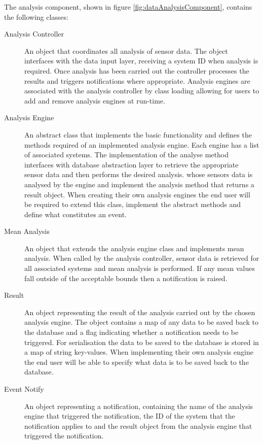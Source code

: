 The analysis component, shown in figure \ref{fig:dataAnalysisComponent}, contains the following classes:
\begin{description}
\item [Analysis Controller] An object that coordinates all analysis of sensor data. The object interfaces with the data input layer, receiving a system ID when analysis is required. Once analysis has been carried out the controller processes the results and triggers notifications where appropriate. Analysis engines are associated with the analysis controller by class loading allowing for users to add and remove analysis engines at run-time.
\item [Analysis Engine] An abstract class that implements the basic functionality and defines the methods required of an implemented analysis engine. Each engine has a list of associated systems. The implementation of the analyse method interfaces with database abstraction layer to retrieve the appropriate sensor data and then performs the desired analysis. whose sensors data is analysed by the engine and implement the analysis method that returns a result object. When creating their own analysis engines the end user will be required to extend this class, implement the abstract methods and define what constitutes an event.
\item [Mean Analysis] An object that extends the analysis engine class and implements mean analysis. When called by the analysis controller, sensor data is retrieved for all associated systems and mean analysis is performed. If any mean values fall outside of the acceptable bounds then a notification is raised.
\item [Result] An object representing the result of the analysis carried out by the chosen analysis engine. The object contains a map of any data to be saved back to the database and a flag indicating whether a notification needs to be triggered. For serialisation the data to be saved to the database is stored in a map of string key-values. When implementing their own analysis engine the end user will be able to specify what data is to be saved back to the database.
\item [Event Notify] An object representing a notification, containing the name of the analysis engine that triggered the notification, the ID of the system that the notification applies to and the result object from the analysis engine that triggered the notification.
\end{description}

